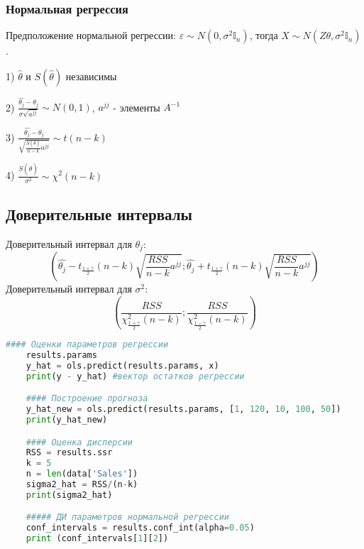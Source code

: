 \subsubsection{Нормальная регрессия}\label{cha:linreg/sec:basic/subsec:theory/subsubsec:normreg}

Предположение нормальной регрессии: $ \varepsilon \sim N(0, \sigma^2 \mathbb{I}_n)$, тогда $\displaystyle X \sim N (Z \theta, \sigma^2 \mathbb{I}_n)$.

\begin{properties}[]\label{lec:linreg/props:1}
	\item[1)] $\hat{\theta}$ и $S(\hat{\theta})$ независимы
	\item[2)] $\displaystyle \frac{\hat{\theta_j} - \theta_j}{\sigma \sqrt{a^{jj}}} \sim N(0,1)$, $a^{jj}$ - элементы $A^{-1}$
	\item[3)] $\displaystyle \frac{\hat{\theta_j} - \theta_j}{\sqrt{\frac{S(\hat{\theta})}{n-k}a^{jj}}} \sim t(n-k)$
	\item[4)] $\displaystyle \frac{S(\hat{\theta})}{\sigma^2} \sim \chi^2 (n-k)$
\end{properties}

\subsection{Доверительные интервалы}\label{cha:linreg/sec:basic/subsec:theory/subsubsec:dovint}


Доверительный интервал для $\theta_j$:
$$\left( \hat{\theta_j} - t_{\frac{1+\gamma}{2}}(n-k) \sqrt{\frac{RSS}{n-k}a^{jj}}; \hat{\theta_j} + t_{\frac{1+\gamma}{2}}(n-k) \sqrt{\frac{RSS}{n-k}a^{jj}} \right)$$
Доверительный интервал для $\sigma^2$:
$$\left( \frac{RSS}{\chi_{\frac{1+\gamma}{2}}^2 (n-k)} ; \frac{RSS}{\chi_{\frac{1-\gamma}{2}}^2 (n-k)} \right)$$

\begin{lstlisting}[language=Python]
	#### Оценки параметров регрессии
	results.params
	y_hat = ols.predict(results.params, x)
	print(y - y_hat) #вектор остатков регрессии

	#### Построение прогноза
	y_hat_new = ols.predict(results.params, [1, 120, 10, 100, 50])
	print(y_hat_new)

	#### Оценка дисперсии
	RSS = results.ssr
	k = 5
	n = len(data['Sales'])
	sigma2_hat = RSS/(n-k)
	print(sigma2_hat)

	##### ДИ параметров нормальной регрессии
	conf_intervals = results.conf_int(alpha=0.05)
	print (conf_intervals[1][2])
\end{lstlisting}

